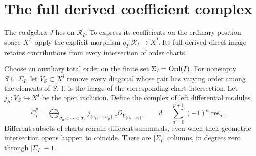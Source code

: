 \section{The full derived coefficient complex}\label{ogd:sec:cech}

The coalgebra \(J\) lies on \(\mathscr R_I\).
To express its coefficients on the ordinary position space \(X^I\), apply the explicit morphism \(q_I:\mathscr R_I\to X^I\).
Its full derived direct image retains contributions from every intersection of order charts.

Choose\label{ogd:def:ordered-chart-cech-data} an auxiliary total order on the finite set \(\Sigma_I=\operatorname{Ord}(I)\).
For nonempty \(S\subseteq\Sigma_I\), let \(V_S\subset X^I\) remove every diagonal whose pair has varying order among the elements of \(S\).
It is the image of the corresponding chart intersection.
Let \(j_S:V_S\hookrightarrow X^I\) be the open inclusion.
Define the complex of left differential modules
\begin{equation}\label{ogd:eq:cech}
 \check C_I^p=\bigoplus_{\sigma_0<\cdots<\sigma_p}
      j_{\{\sigma_0,\ldots,\sigma_p\},*}\mathcal O_{V_{\{\sigma_0,\ldots,\sigma_p\}}},
 \qquad d=\sum_{a=0}^{p+1}(-1)^a\operatorname{res}_a.
\end{equation}
Different subsets of charts remain different summands, even when their geometric intersection opens happen to coincide.
There are \(|\Sigma_I|\) columns, in degrees zero through \(|\Sigma_I|-1\).

